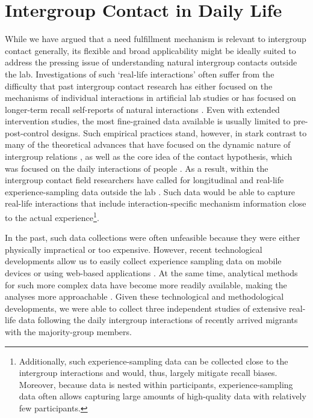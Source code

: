\documentclass[man, 12pt, a4paper, mask]{apa7}
\theoremstyle{break}
\theoremstyle{plain}
\begin{document}
\section{Intergroup Contact in Daily Life}
While we have argued that a need fulfillment mechanism is relevant to intergroup contact generally, its flexible and broad applicability might be ideally suited to address the pressing issue of understanding natural intergroup contacts outside the lab. Investigations of such `real-life interactions' often suffer from the difficulty that past intergroup contact research has either focused on the mechanisms of individual interactions in artificial lab studies or has focused on longer-term recall self-reports of natural interactions \citep[e.g.,][]{Pettigrew2006}. Even with extended intervention studies, the most fine-grained data available is usually limited to pre-post-control designs. Such empirical practices stand, however, in stark contrast to many of the theoretical advances that have focused on the dynamic nature of intergroup relations \citep[e.g.,][]{Pettigrew1998}, as well as the core idea of the contact hypothesis, which was focused on the daily interactions of people \citep[][]{Allport1954b}. As a result, within the intergroup contact field researchers have called for longitudinal \citep[][]{Pettigrew1998, Pettigrew2008, Pettigrew2011} and real-life experience-sampling data outside the lab \citep[][]{MacInnis2015, McKeown2017}. Such data would be able to capture real-life interactions that include interaction-specific mechanism information close to the actual experience\footnote{Additionally, such experience-sampling data can be collected close to the intergroup interactions and would, thus, largely mitigate recall biases. Moreover, because data is nested within participants, experience-sampling data often allows capturing large amounts of high-quality data with relatively few participants.}.

In the past, such data collections were often unfeasible because they were either physically impractical or too expensive. However, recent technological developments allow us to easily collect experience sampling data on mobile devices \citep[e.g.,][]{Keil2020} or using web-based applications \citep[e.g.,][]{Arslan2020}. At the same time, analytical methods for such more complex data have become more readily available, making the analyses more approachable \citep[e.g., see][]{ODonnell2021}. Given these technological and methodological developments, we were able to collect three independent studies of extensive real-life data following the daily intergroup interactions of recently arrived migrants with the majority-group members.  
\end{document}
